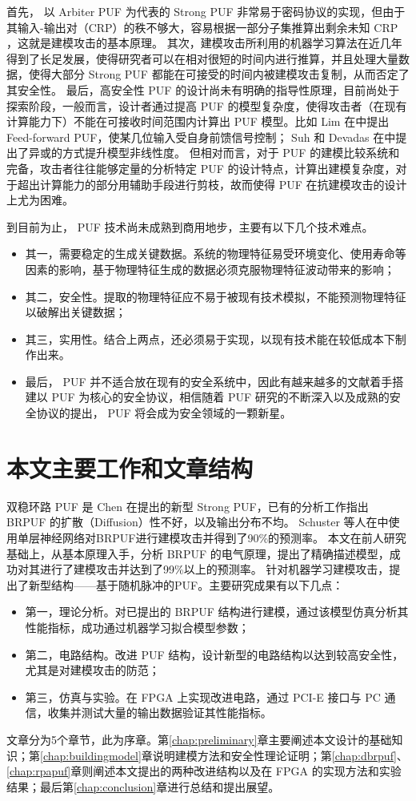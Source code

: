 首先， 以 Arbiter PUF 为代表的 Strong PUF 非常易于密码协议的实现，但由于其输入-输出对（CRP）的秩不够大，容易根据一部分子集推算出剩余未知 CRP ，这就是建模攻击的基本原理。
其次，建模攻击所利用的机器学习算法在近几年得到了长足发展，使得研究者可以在相对很短的时间内进行推算，并且处理大量数据，使得大部分 Strong PUF 都能在可接受的时间内被建模攻击复制，从而否定了其安全性。
最后，高安全性 PUF 的设计尚未有明确的指导性原理，目前尚处于探索阶段，一般而言，设计者通过提高 PUF 的模型复杂度，使得攻击者（在现有计算能力下）不能在可接收时间范围内计算出 PUF 模型。比如 Lim 在\parencite{lee2004technique}中提出 Feed-forward PUF，使某几位输入受自身前馈信号控制； Suh 和 Devadas 在\parencite{suh2007physical}中提出了异或的方式提升模型非线性度。
但相对而言，对于 PUF 的建模比较系统和完备，攻击者往往能够定量的分析特定 PUF 的设计特点，计算出建模复杂度，对于超出计算能力的部分用辅助手段进行剪枝\supercite{mahmoud2013combined,xu2014hybrid}，故而使得 PUF 在抗建模攻击的设计上尤为困难。

到目前为止， PUF 技术尚未成熟到商用地步，主要有以下几个技术难点。
\begin{itemize}
\item 其一，需要稳定的生成关键数据。系统的物理特征易受环境变化、使用寿命等因素的影响，基于物理特征生成的数据必须克服物理特征波动带来的影响；
\item 其二，安全性。提取的物理特征应不易于被现有技术模拟，不能预测物理特征以破解出关键数据；
\item 其三，实用性。结合上两点，还必须易于实现，以现有技术能在较低成本下制作出来。
\item 最后， PUF 并不适合放在现有的安全系统中，因此有越来越多的文献着手搭建以 PUF 为核心的安全协议，相信随着 PUF 研究的不断深入以及成熟的安全协议的提出， PUF 将会成为安全领域的一颗新星。
\end{itemize}

\section{本文主要工作和文章结构}\label{sec:mainworks}
双稳环路 PUF 是 Chen 在\parencite{chen2011bistable}提出的新型 Strong PUF，已有的分析工作指出 BRPUF 的扩散（Diffusion）性不好，以及输出分布不均\supercite{chen2012characterization,yamamoto2014security}。
Schuster 等人在\parencite{schuster2014evaluation}中使用单层神经网络对BRPUF进行建模攻击并得到了90\%的预测率。
本文在前人研究基础上，从基本原理入手，分析 BRPUF 的电气原理，提出了精确描述模型，成功对其进行了建模攻击并达到了99\%以上的预测率。
针对机器学习建模攻击，提出了新型结构——基于随机脉冲的PUF。主要研究成果有以下几点：
\begin{itemize}
\item 第一，理论分析。对已提出的 BRPUF 结构进行建模，通过该模型仿真分析其性能指标，成功通过机器学习拟合模型参数；
\item 第二，电路结构。改进 PUF 结构，设计新型的电路结构以达到较高安全性，尤其是对建模攻击的防范；
\item 第三，仿真与实验。在 FPGA 上实现改进电路，通过 PCI-E 接口与 PC 通信，收集并测试大量的输出数据验证其性能指标。
\end{itemize}

文章分为5个章节，此为序章。第\ref{chap:preliminary}章主要阐述本文设计的基础知识；第\ref{chap:buildingmodel}章说明建模方法和安全性理论证明；第\ref{chap:dbrpuf}、\ref{chap:rpapuf}章则阐述本文提出的两种改进结构以及在 FPGA 的实现方法和实验结果；最后第\ref{chap:conclusion}章进行总结和提出展望。
